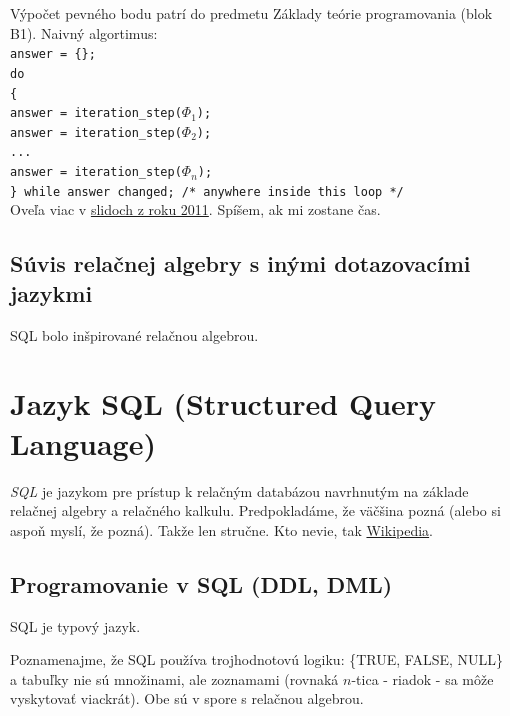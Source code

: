 \documentclass[10pt,a4paper]{article}
\begin{document}
Výpočet pevného bodu patrí do predmetu Základy teórie programovania (blok B1).
Naivný algortimus: \\
\verb|answer = {};| \\
\verb|do| \\
\verb|{| \\
\verb|answer = iteration_step(|$\Phi_1$\verb|);| \\
\verb|answer = iteration_step(|$\Phi_2$\verb|);| \\
\verb|...| \\
\verb|answer = iteration_step(|$\Phi_n$\verb|);| \\
\verb|} while answer changed; /* anywhere inside this loop */| \\

Oveľa viac v \href{http://www.dcs.fmph.uniba.sk/~plachetk/TEACHING/DB2011/db2011_5.pdf}{slidoch z roku 2011}. Spíšem, ak mi zostane čas.


\subsection{Súvis relačnej algebry s inými dotazovacími jazykmi}
\label{relacna_algebra_suvis}

SQL bolo inšpirované relačnou algebrou.

\section{Jazyk SQL (Structured Query Language)}
\emph{SQL} je jazykom pre prístup k relačným databázou navrhnutým na základe relačnej algebry a relačného kalkulu.
Predpokladáme, že väčšina pozná (alebo si aspoň myslí, že pozná). Takže len stručne.
Kto nevie, tak \href{http://en.wikipedia.org/wiki/SQL}{Wikipedia}.

\subsection{Programovanie v SQL (DDL, DML)}

SQL je typový jazyk.

Poznamenajme, že SQL používa trojhodnotovú logiku: \{TRUE, FALSE, NULL\}
a tabuľky nie sú množinami, ale zoznamami (rovnaká $n$-tica - riadok - sa môže vyskytovať viackrát). Obe sú v spore s relačnou algebrou.
\end{document}

